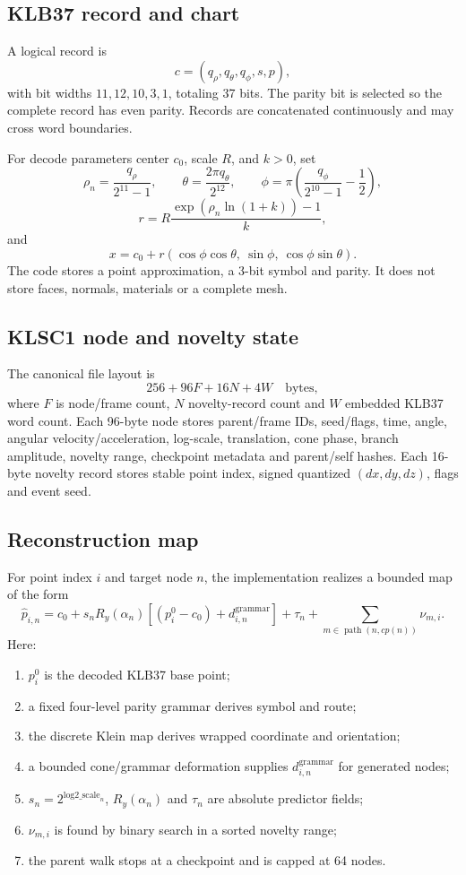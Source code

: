 \documentclass[10pt,a4paper]{article}
\begin{document}
\subsection{KLB37 record and chart}

A logical record is
\[
c=(q_\rho,q_\theta,q_\phi,s,p),
\]
with bit widths \(11,12,10,3,1\), totaling 37 bits. The parity bit is selected so the complete record has even parity. Records are concatenated continuously and may cross word boundaries.

For decode parameters center \(c_0\), scale \(R\), and \(k>0\), set
\[
\rho_n=\frac{q_\rho}{2^{11}-1},\qquad
\theta=\frac{2\pi q_\theta}{2^{12}},\qquad
\phi=\pi\left(\frac{q_\phi}{2^{10}-1}-\frac12\right),
\]
\[
r=R\frac{\exp(\rho_n\ln(1+k))-1}{k},
\]
and
\[
x=c_0+r(\cos\phi\cos\theta,\ \sin\phi,\ \cos\phi\sin\theta).
\]
The code stores a point approximation, a 3-bit symbol and parity. It does not store faces, normals, materials or a complete mesh.

\subsection{KLSC1 node and novelty state}

The canonical file layout is
\[
256+96F+16N+4W\quad\text{bytes},
\]
where \(F\) is node/frame count, \(N\) novelty-record count and \(W\) embedded KLB37 word count. Each 96-byte node stores parent/frame IDs, seed/flags, time, angle, angular velocity/acceleration, log-scale, translation, cone phase, branch amplitude, novelty range, checkpoint metadata and parent/self hashes. Each 16-byte novelty record stores stable point index, signed quantized \((dx,dy,dz)\), flags and event seed.

\subsection{Reconstruction map}

For point index \(i\) and target node \(n\), the implementation realizes a bounded map of the form
\[
\widehat p_{i,n}
=c_0+s_nR_y(\alpha_n)
\left[(p_i^0-c_0)+d_{i,n}^{\mathrm{grammar}}\right]
+\tau_n
+\sum_{m\in\operatorname{path}(n,cp(n))}\nu_{m,i}.
\]
Here:

\begin{enumerate}
  \item \(p_i^0\) is the decoded KLB37 base point;
  \item a fixed four-level parity grammar derives symbol and route;
  \item the discrete Klein map derives wrapped coordinate and orientation;
  \item a bounded cone/grammar deformation supplies \(d_{i,n}^{\mathrm{grammar}}\) for generated nodes;
  \item \(s_n=2^{\mathrm{log2\_scale}_n}\), \(R_y(\alpha_n)\) and \(\tau_n\) are absolute predictor fields;
  \item \(\nu_{m,i}\) is found by binary search in a sorted novelty range;
  \item the parent walk stops at a checkpoint and is capped at 64 nodes.
\end{enumerate}
\end{document}
